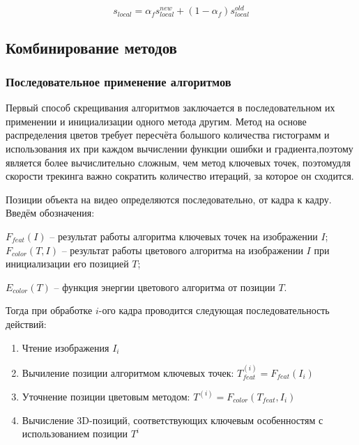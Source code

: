 \begin{equation}
s_{local} =  \alpha_f s_{local}^{new} + (1 - \alpha_f)  s_{local}^{old} 
\end{equation}


\subsection{Комбинирование методов}

\subsubsection{Последовательное применение алгоритмов}


Первый способ скрещивания алгоритмов заключается в последовательном их
применении и инициализации одного метода другим.
Метод на основе распределения цветов требует пересчёта большого количества
гистограмм и использования их при каждом вычислении функции ошибки и
градиента,поэтому является более вычислительно сложным, чем метод ключевых
точек, поэтомудля скорости трекинга важно сократить количество итераций, за
которое он
сходится.

Позиции объекта на видео определяются последовательно, от кадра к кадру.
Введём обозначения:

$F_{feat}(I)$ -- результат работы алгоритма ключевых точек на изображении $I$;
$F_{color}(T, I)$ -- результат работы цветового алгоритма на изображении $I$
при инициализации его позицией $T$;

$E_{color}(T)$ -- функция энергии цветового алгоритма от позиции $T$.

Тогда при обработке $i$-ого кадра проводится следующая последовательность
действий:

\begin{enumerate}
\item Чтение изображения $I_i$
\item Вычиление позиции алгоритмом ключевых точек:
    $T_{feat}^{(i)} = F_{feat}(I_i)$
\item Уточнение позиции цветовым методом:
    $T^{(i)} = F_{color}(T_{feat}, I_i)$
\item Вычисление  3D-позиций, соответствующих ключевым особенностям с
    использованием позиции $T^i$
\end{enumerate}

